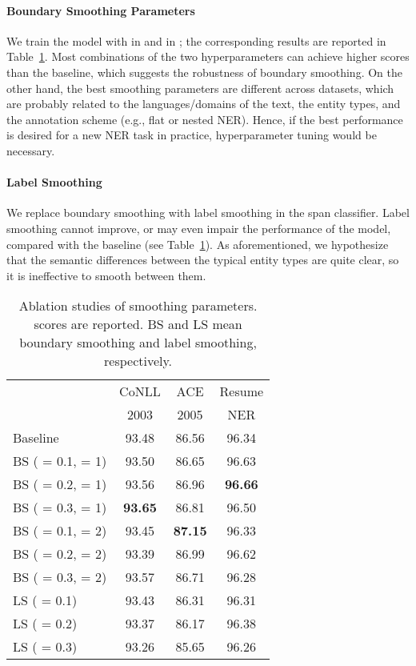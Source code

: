 \documentclass[11pt]{article}
\begin{document}
\paragraph{Boundary Smoothing Parameters} We train the model with  in  and  in ; the corresponding results are reported in Table~\ref{tab:ablation-parameters}. Most combinations of the two hyperparameters can achieve higher  scores than the baseline, which suggests the robustness of boundary smoothing. On the other hand, the best smoothing parameters are different across datasets, which are probably related to the languages/domains of the text, the entity types, and the annotation scheme (e.g., flat or nested NER). Hence, if the best performance is desired for a new NER task in practice, hyperparameter tuning would be necessary. 

\paragraph{Label Smoothing} We replace boundary smoothing with label smoothing in the span classifier. Label smoothing cannot improve, or may even impair the performance of the model, compared with the baseline (see Table~\ref{tab:ablation-parameters}). As aforementioned, we hypothesize that the semantic differences between the typical entity types are quite clear, so it is ineffective to smooth between them. 

\begin{table}[t]
    \centering \small
    \begin{tabular}{lccc}
        \toprule
         & CoNLL & ACE  & Resume \\
         & 2003  & 2005 & NER \\
        \midrule
        Baseline          & 93.48 & 86.56 & 96.34 \\
        \midrule
        BS ( = 0.1,  = 1) & 93.50 & 86.65 & 96.63 \\
        BS ( = 0.2,  = 1) & 93.56 & 86.96 & \textbf{96.66} \\
        BS ( = 0.3,  = 1) & \textbf{93.65} & 86.81 & 96.50 \\
        BS ( = 0.1,  = 2) & 93.45 & \textbf{87.15} & 96.33 \\
        BS ( = 0.2,  = 2) & 93.39 & 86.99 & 96.62 \\
        BS ( = 0.3,  = 2) & 93.57 & 86.71 & 96.28 \\
        \midrule
        LS ( = 0.1) & 93.43 & 86.31 & 96.31 \\
        LS ( = 0.2) & 93.37 & 86.17 & 96.38 \\
        LS ( = 0.3) & 93.26 & 85.65 & 96.26 \\
        \bottomrule
    \end{tabular}
    \caption{Ablation studies of smoothing parameters.  scores are reported. BS and LS mean boundary smoothing and label smoothing, respectively.}
    \label{tab:ablation-parameters}
\end{table}
\end{document}
